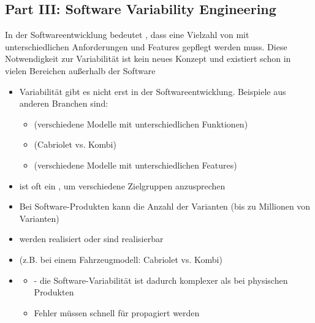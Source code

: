 \subsection{Part III: Software Variability Engineering}
\begin{infoBox}
    In der Softwareentwicklung bedeutet , dass eine Vielzahl von  mit unterschiedlichen Anforderungen und Features gepflegt werden muss. Diese Notwendigkeit zur Variabilität ist kein neues Konzept und existiert schon in vielen Bereichen außerhalb der Software
\end{infoBox}
\begin{infoBox}[title=Produktvariabilität vor der Software-Ära]
    \begin{itemize}
        \item Variabilität gibt es nicht erst in der Softwareentwicklung. Beispiele aus anderen Branchen sind:
        \begin{itemize}
            \item {} (verschiedene Modelle mit unterschiedlichen Funktionen)
            \item {} (Cabriolet vs. Kombi)
            \item {} (verschiedene Modelle mit unterschiedlichen Features)
        \end{itemize}
        \item {} ist oft ein , um verschiedene Zielgruppen anzusprechen
    \end{itemize}
\end{infoBox}
\begin{infoBox}[title=Herausforderungen bei der Software-Variablität]
    \begin{itemize}
        \item Bei Software-Produkten kann die Anzahl der Varianten  (bis zu Millionen von Varianten)
        \item {} werden realisiert oder sind realisierbar
        \item {} (z.B. bei einem Fahrzeugmodell: Cabriolet vs. Kombi)
    \end{itemize}
    \begin{itemize}
        \item {}
        \begin{itemize}
            \item {} - die Software-Variabilität ist dadurch komplexer als bei physischen Produkten
            \item {} Fehler müssen schnell für  propagiert werden
        \end{itemize}
    \end{itemize}
\end{infoBox}
